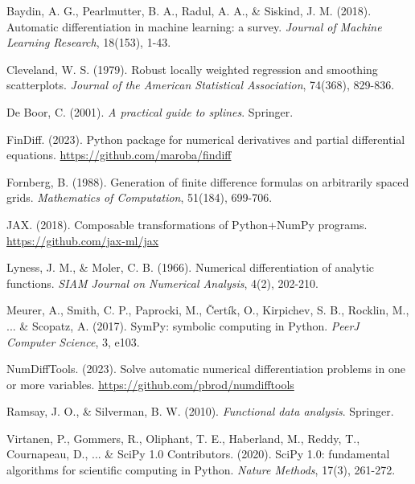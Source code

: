 \documentclass[11pt,a4paper]{article}
\begin{document}

\begin{thebibliography}{9}

Baydin, A. G., Pearlmutter, B. A., Radul, A. A., \& Siskind, J. M. (2018).
\newblock Automatic differentiation in machine learning: a survey.
\newblock \emph{Journal of Machine Learning Research}, 18(153), 1-43.

Cleveland, W. S. (1979).
\newblock Robust locally weighted regression and smoothing scatterplots.
\newblock \emph{Journal of the American Statistical Association}, 74(368), 829-836.

De Boor, C. (2001).
\newblock \emph{A practical guide to splines}.
\newblock Springer.

FinDiff. (2023).
\newblock Python package for numerical derivatives and partial differential equations.
\newblock \url{https://github.com/maroba/findiff}

Fornberg, B. (1988).
\newblock Generation of finite difference formulas on arbitrarily spaced grids.
\newblock \emph{Mathematics of Computation}, 51(184), 699-706.

JAX. (2018).
\newblock Composable transformations of Python+NumPy programs.
\newblock \url{https://github.com/jax-ml/jax}

Lyness, J. M., \& Moler, C. B. (1966).
\newblock Numerical differentiation of analytic functions.
\newblock \emph{SIAM Journal on Numerical Analysis}, 4(2), 202-210.

Meurer, A., Smith, C. P., Paprocki, M., Čertík, O., Kirpichev, S. B., Rocklin, M., ... \& Scopatz, A. (2017).
\newblock SymPy: symbolic computing in Python.
\newblock \emph{PeerJ Computer Science}, 3, e103.

NumDiffTools. (2023).
\newblock Solve automatic numerical differentiation problems in one or more variables.
\newblock \url{https://github.com/pbrod/numdifftools}

Ramsay, J. O., \& Silverman, B. W. (2010).
\newblock \emph{Functional data analysis}.
\newblock Springer.

Virtanen, P., Gommers, R., Oliphant, T. E., Haberland, M., Reddy, T., Cournapeau, D., ... \& SciPy 1.0 Contributors. (2020).
\newblock SciPy 1.0: fundamental algorithms for scientific computing in Python.
\newblock \emph{Nature Methods}, 17(3), 261-272.

\end{thebibliography}
\end{document}
